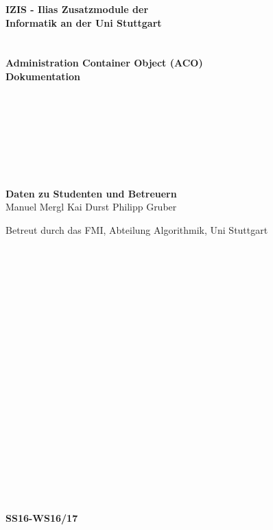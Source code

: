 
\begin{center}
	 \large\textbf{IZIS - Ilias Zusatzmodule der\\ Informatik an der Uni Stuttgart}
	 \\~\\~\\
	 \huge\textbf{Administration Container Object (ACO)\\Dokumentation}
\end{center}
~\\~\\~\\~\\~\\~\\~\\
	\large\textbf{Daten zu Studenten und Betreuern}\\
	Manuel Mergl
	Kai Durst
	Philipp Gruber
	
	Betreut durch das FMI, Abteilung Algorithmik, Uni Stuttgart
	
	\\~\\\\~\\~\\~\\~\\~\\~\\~\\~\\~\\~\\~\\~\\~\\~\\~\\~\\
	 		
	 		
\begin{center}
	 \textbf{SS16-WS16/17}
\end{center}
	
	
 